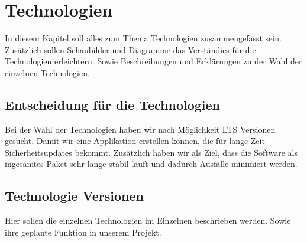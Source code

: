 \section{Technologien}
In diesem Kapitel soll alles zum Thema Technologien zusammengefasst sein.
Zusätzlich sollen Schaubilder und Diagramme das Verständies für die Technologien erleichtern.
Sowie Beschreibungen und Erklärungen zu der Wahl der einzelnen Technologien.

\subsection{Entscheidung für die Technologien}
Bei der Wahl der Technologien haben wir nach Möglichkeit LTS Versionen gesucht.
Damit wir eine Applikation erstellen können, die für lange Zeit Sicherheitsupdates
bekommt. Zusätzlich haben wir als Ziel, dass die Software als ingesamtes Paket sehr lange
stabil läuft und dadurch Ausfälle minimiert werden.

\subsection{Technologie Versionen}
Hier sollen die einzelnen Technologien im Einzelnen beschrieben werden.
Sowie ihre geplante Funktion in unserem Projekt.

